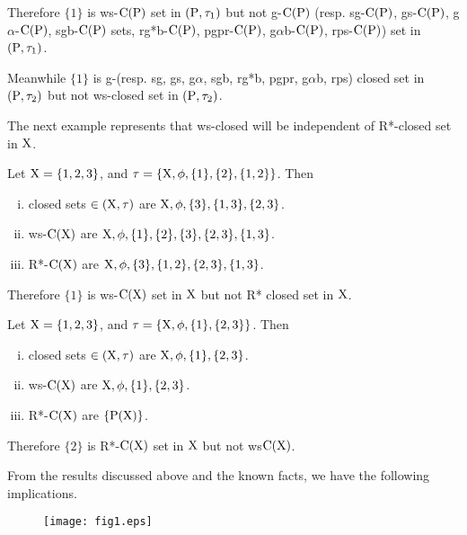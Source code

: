 \begin{exm}
Therefore $\{1\}$ is ws-$\mathrm{C}(\mathrm{P})$ set in $(\mathrm{P}, \tau_{1})$ but not g-$\mathrm{C}(\mathrm{P})$ (resp. sg-$\mathrm{C}(\mathrm{P})$, gs-$\mathrm{C}(\mathrm{P})$, g$\alpha$-$\mathrm{C}(\mathrm{P})$, sgb-$\mathrm{C}(\mathrm{P})$ sets, rg*b-$\mathrm{C}(\mathrm{P})$, pgpr-$\mathrm{C}(\mathrm{P})$, g$\alpha$b-$\mathrm{C}(\mathrm{P})$, rps-$\mathrm{C}(\mathrm{P})$) set in $(\mathrm{P}, \tau_{1})$.

Meanwhile $\{1\}$ is g-(resp. sg, gs, g$\alpha$, sgb, rg*b, pgpr, g$\alpha$b, rps) closed set in $(\mathrm{P}, \tau_{2})$ but not ws-closed set in $(\mathrm{P}, \tau_{2})$.
\end{exm}

\begin{rem}\label{rem2.2.20}
The next example represents that ws-closed will be independent of R*-closed set in $\mathrm{X}$.
\end{rem}

\begin{exm}\label{exm2.2.21}
Let $\mathrm{X}=\{1,2,3\}$, and $\tau=\{\mathrm{X},\phi,\{1\},\{2\},\{1,2\}\}$. Then
\begin{enumerate}[(i)]
\item closed sets $\in(\mathrm{X}, \tau)$ are $\mathrm{X}, \phi,\{3\},\{1, 3\},\{2, 3\}$.
\item ws-$\mathrm{C}(\mathrm{X})$ are $\mathrm{X}, \phi, \{1\},\{2\},\{3\},\{2, 3\}, \{1, 3\}$.
\item R*-$\mathrm{C}(\mathrm{X})$ are $\mathrm{X}, \phi,\{3\},\{1, 2\},\{2, 3\},\{1, 3\}$.
\end{enumerate}

Therefore $\{1\}$ is ws-$\mathrm{C}(\mathrm{X})$ set in $\mathrm{X}$ but not R* closed set in $\mathrm{X}$.
\end{exm}

\begin{exm}\label{add-exm2.2.21}
Let $\mathrm{X}=\{1,2,3\}$, and $\tau=\{\mathrm{X},\phi,\{1\},\{2,3\}\}$. Then
\begin{enumerate}[(i)]
\item closed sets $\in(\mathrm{X}, \tau)$ are $\mathrm{X}, \phi,\{1\},\{2, 3\}$.
\item ws-$\mathrm{C}(\mathrm{X})$ are $\mathrm{X}, \phi, \{1\},\{2, 3\}$.
\item R*-$\mathrm{C}(\mathrm{X})$ are $\{\mathrm{P}(\mathrm{X})\}$.
\end{enumerate}

Therefore $\{2\}$ is R*-$\mathrm{C}(\mathrm{X})$ set in $\mathrm{X}$ but not ws$\mathrm{C}(\mathrm{X})$.
\end{exm}

\begin{rem}\label{rem2.2.22}
From the results discussed above and the known facts, we have the following implications.

\begin{figure}[H]
\centering
\texttt{[image: fig1.eps]}
\end{figure}
\end{rem}

